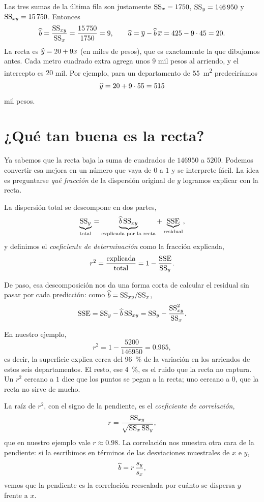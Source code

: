 Las tres sumas de la última fila son justamente \(\mathrm{SS}_{x}=\num{1750}\), \(\mathrm{SS}_{y}=\num{146950}\) y \(\mathrm{SS}_{xy}=\num{15750}\). Entonces
\[\widehat{b} = \frac{\mathrm{SS}_{xy}}{\mathrm{SS}_{x}} = \frac{\num{15750}}{\num{1750}} = 9, \qquad \widehat{a} = \overline{y} - \widehat{b}\,\overline{x} = 425 - 9\cdot 45 = 20.\]
La recta es \(\widehat{y} = 20 + 9x\) (en miles de pesos), que es exactamente la que dibujamos antes. Cada metro cuadrado extra agrega unos \(9\) mil pesos al arriendo, y el intercepto es \(20\) mil. Por ejemplo, para un departamento de \qty{55}{\meter\squared} predeciríamos \[\widehat{y} = 20 + 9\cdot 55 = 515\] mil pesos.

\section{¿Qué tan buena es la recta?}

Ya sabemos que la recta baja la suma de cuadrados de \(\num{146950}\) a \(\num{5200}\). Podemos convertir esa mejora en un número que vaya de \(0\) a \(1\) y se interprete fácil. La idea es preguntarse \emph{qué fracción} de la dispersión original de \(y\) logramos explicar con la recta.

\formal
La dispersión total se descompone en dos partes,
\[\underbrace{\mathrm{SS}_{y}}_{\text{total}} = \underbrace{\widehat{b}\,\mathrm{SS}_{xy}}_{\text{explicada por la recta}} + \underbrace{\mathrm{SSE}}_{\text{residual}},\]
y definimos el \emph{coeficiente de determinación} como la fracción explicada,
\[r^2 = \frac{\text{explicada}}{\text{total}} = 1 - \frac{\mathrm{SSE}}{\mathrm{SS}_{y}}.\]
\informal

De paso, esa descomposición nos da una forma corta de calcular el residual sin pasar por cada predicción: como \(\widehat{b}=\mathrm{SS}_{xy}/\mathrm{SS}_{x}\), \[\mathrm{SSE} = \mathrm{SS}_{y} - \widehat{b}\,\mathrm{SS}_{xy} = \mathrm{SS}_{y} - \frac{\mathrm{SS}_{xy}^2}{\mathrm{SS}_{x}}.\]

En nuestro ejemplo, \[r^2 = 1 - \frac{\num{5200}}{\num{146950}} = \num{0,965},\] es decir, la superficie explica cerca del \qty{96}{\percent} de la variación en los arriendos de estos seis departamentos. El resto, ese \qty{4}{\percent}, es el ruido que la recta no captura. Un \(r^2\) cercano a \(1\) dice que los puntos se pegan a la recta; uno cercano a \(0\), que la recta no sirve de mucho.

La raíz de \(r^2\), con el signo de la pendiente, es el \emph{coeficiente de correlación}, \[r = \frac{\mathrm{SS}_{xy}}{\sqrt{\mathrm{SS}_{x}\,\mathrm{SS}_{y}}},\] que en nuestro ejemplo vale \(r\approx\num{0,98}\). La correlación nos muestra otra cara de la pendiente: si la escribimos en términos de las desviaciones muestrales de \(x\) e \(y\), \[\widehat{b} = r\,\frac{s_y}{s_x},\] vemos que la pendiente es la correlación reescalada por cuánto se dispersa \(y\) frente a \(x\).

